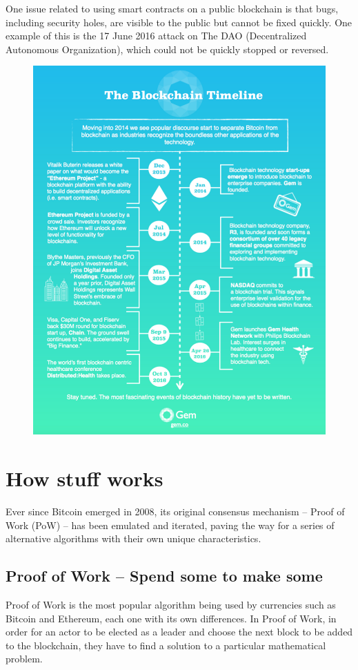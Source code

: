 \documentclass[a4paper]{article}
\begin{document}
	One issue related to using smart contracts on a public blockchain is that bugs, including security holes, are visible to the public but cannot be fixed quickly.\cite{peck2016ethereum} One example of this is the 17 June 2016 attack on The DAO (Decentralized Autonomous Organization), which could not be quickly stopped or reversed.\cite{popper2016hacker}
	\begin{figure}[H]
		\centering
		\includegraphics[width=1\linewidth]{2.png}
	\end{figure}
	
	\section{How stuff works}
	Ever since Bitcoin emerged in 2008, its original consensus mechanism – Proof of Work (PoW) – has been emulated and iterated, paving the way for a series of alternative algorithms with their own unique characteristics.
	
	\subsection{Proof of Work -- Spend some to make some}
	Proof of Work is the most popular algorithm being used by currencies such as Bitcoin and Ethereum, each one with its own differences. In Proof of Work, in order for an actor to be elected as a leader and choose the next block to be added to the blockchain, they have to find a solution to a particular mathematical problem.
	
\end{document}
